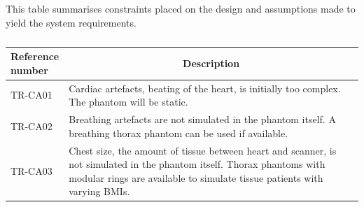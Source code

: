 \begin{table}[H]
\caption{}
\label{tab:constassump}
This table summarises constraints placed on the design and assumptions made to yield the system requirements.
\begin{tabular}{l|p{120mm}|}
	\makecell[l]{\textbf{Reference} \\ \textbf{number}} & \multicolumn{1}{c}{\textbf{Description}}\\
	\hline
	TR-CA01 &  Cardiac artefacts, beating of the heart, is initially too complex. The phantom will be static. \\
	TR-CA02 & Breathing artefacts are not simulated in the phantom itself. A breathing thorax phantom can be used if available. \\
	TR-CA03 & Chest size, the amount of tissue between heart and scanner, is not simulated in the phantom itself. Thorax phantoms with modular rings are available to simulate tissue patients with varying BMIs. \\
	\cline{2-2}
\end{tabular}
\end{table}

